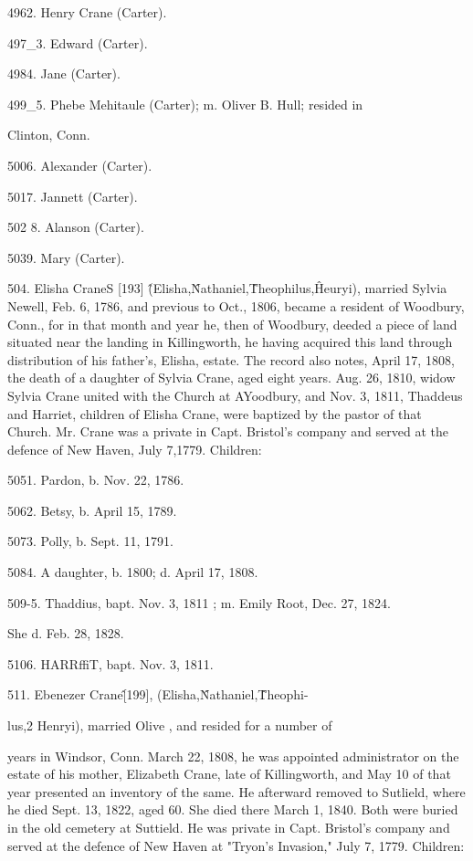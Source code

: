 4962. Henry Crane (Carter). 

497\_3. Edward (Carter). 

4984. Jane (Carter). 

499\_5. Phebe Mehitaule (Carter); m. Oliver B. Hull; resided in 

Clinton, Conn. 

5006. Alexander (Carter). 

5017. Jannett (Carter). 

502  8. Alanson (Carter). 

5039. Mary (Carter). 

504. Elisha CraneS [193] \^ (Elisha,\^ Nathaniel,\^ Theophilus,\^ 
Heuryi), married Sylvia Newell, Feb. 6, 1786, and previous to 
Oct., 1806, became a resident of Woodbury, Conn., for in that 
month and year he, then of Woodbury, deeded a piece of land 
situated near the landing in Killingworth, he having acquired 
this land through distribution of his father's, Elisha, estate. The 
record also notes, April 17, 1808, the death of a daughter of 
Sylvia Crane, aged eight years. Aug. 26, 1810, widow Sylvia 
Crane united with the Church at AYoodbury, and Nov. 3, 1811, 
Thaddeus and Harriet, children of Elisha Crane, were baptized 
by the pastor of that Church. Mr. Crane was a private in Capt. 
Bristol's company and served at the defence of New Haven, July 
7,1779. Children: 

5051. Pardon, b. Nov. 22, 1786. 

5062. Betsy, b. April 15, 1789. 

5073. Polly, b. Sept. 11, 1791. 

5084. A daughter, b. 1800; d. April 17, 1808. 

509-5. Thaddius, bapt. Nov. 3, 1811 ; m. Emily Root, Dec. 27, 1824. 

She d. Feb. 28, 1828. 

5106. HARRffiT, bapt. Nov. 3, 1811. 

511. Ebenezer Crane\^ [199], (Elisha,\^ Nathaniel,\^ Theophi- 

lus,2 Henryi), married Olive , and resided for a number of 

years in Windsor, Conn. March 22, 1808, he was appointed 
administrator on the estate of his mother, Elizabeth Crane, late 
of Killingworth, and May 10 of that year presented an inventory 
of the same. He afterward removed to Sutlield, where he died 
Sept. 13, 1822, aged 60. She died there March 1, 1840. Both 
were buried in the old cemetery at Suttield. He was private in 
Capt. Bristol's company and served at the defence of New Haven 
at "Tryon's Invasion," July 7, 1779. Children: 




